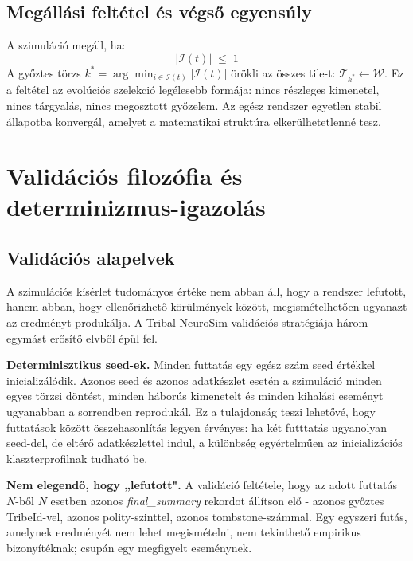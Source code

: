 \subsection*{Megállási feltétel és végső egyensúly}

A szimuláció megáll, ha:
\begin{equation}
|\mathcal{I}(t)| \;\leq\; 1
\end{equation}
A győztes törzs $k^* = \arg\min_{i \in \mathcal{I}(t)} |\mathcal{I}(t)|$ örökli az összes
tile-t: $\mathcal{T}_{k^*} \leftarrow \mathcal{W}$. Ez a feltétel az evolúciós szelekció
legélesebb formája: nincs részleges kimenetel, nincs tárgyalás, nincs megosztott győzelem.
Az egész rendszer egyetlen stabil állapotba konvergál, amelyet a matematikai struktúra
elkerülhetetlenné tesz.

\section{Validációs filozófia és determinizmus-igazolás}
\label{sec:neurosim-26-validation}

\subsection*{Validációs alapelvek}

A szimulációs kísérlet tudományos értéke nem abban áll, hogy a rendszer lefutott, hanem abban, hogy ellenőrizhető körülmények között, megismételhetően ugyanazt az eredményt produkálja. A Tribal NeuroSim validációs stratégiája három egymást erősítő elvből épül fel.

\textbf{Determinisztikus seed-ek.} Minden futtatás egy egész szám seed értékkel inicializálódik. Azonos seed és azonos adatkészlet esetén a szimuláció minden egyes törzsi döntést, minden háborús kimenetelt és minden kihalási eseményt ugyanabban a sorrendben reprodukál. Ez a tulajdonság teszi lehetővé, hogy futtatások között összehasonlítás legyen érvényes: ha két futttatás ugyanolyan seed-del, de eltérő adatkészlettel indul, a különbség egyértelműen az inicializációs klaszterprofilnak tudható be.

\textbf{Nem elegendő, hogy „lefutott".} A validáció feltétele, hogy az adott futtatás $N$-ből $N$ esetben azonos \textit{final\_summary} rekordot állítson elő - azonos győztes TribeId-vel, azonos polity-szinttel, azonos tombstone-számmal. Egy egyszeri futás, amelynek eredményét nem lehet megismételni, nem tekinthető empirikus bizonyítéknak; csupán egy megfigyelt eseménynek.

